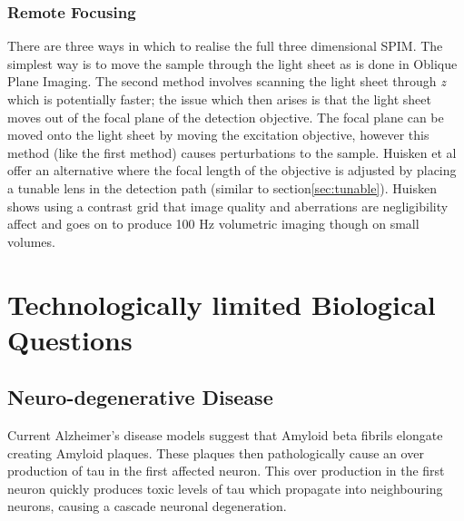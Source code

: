\subsubsection{Remote Focusing}

There are three ways in which to realise the full three dimensional SPIM.
The simplest way is to move the sample through the light sheet as is done in Oblique Plane Imaging.
The second method involves scanning the light sheet through \textit{z} which is potentially faster; the issue which then arises is that the light sheet moves out of the focal plane of the detection objective.
The focal plane can be moved onto the light sheet by moving the excitation objective, however this method (like the first method) causes perturbations to the sample.
Huisken et al offer an alternative where the focal length of the objective is adjusted by placing a tunable lens in the detection path (similar to section\ref{sec:tunable})\cite{Fahrbach2013}.
Huisken shows using a contrast grid that image quality and aberrations are negligibility affect and goes on to produce 100 Hz volumetric imaging though on small volumes\cite{Fahrbach2013}.

\section{Technologically limited Biological Questions}



\subsection{Neuro-degenerative Disease}


Current Alzheimer's disease models suggest that Amyloid beta fibrils elongate creating Amyloid plaques.
These plaques then pathologically cause an over production of tau in the first affected neuron.
This over production in the first neuron quickly produces toxic levels of tau which propagate into neighbouring neurons, causing a cascade neuronal degeneration\cite{King2002}.

